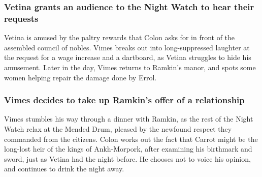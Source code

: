 \subsubsection{\Gls{Vetina} grants an audience to the Night Watch to hear their requests}
\Gls{Vetina} is amused by the paltry rewards that \Gls{Colon} asks for in front of the assembled
council of nobles. \Gls{Vimes} breaks out into long-suppressed laughter at the request for a wage
increase and a dartboard, as \Gls{Vetina} struggles to hide his amusement. Later in the day,
\Gls{Vimes} returns to \Gls{Ramkin}'s manor, and spots some women helping repair the damage done
by \Gls{Errol}.

\subsubsection{\Gls{Vimes} decides to take up \Gls{Ramkin}'s offer of a relationship}
\Gls{Vimes} stumbles his way through a dinner with \Gls{Ramkin}, as the rest of the Night Watch
relax at the Mended Drum, pleased by the newfound respect they commanded from the citizens.
\Gls{Colon} works out the fact that \Gls{Carrot} might be the long-lost heir of the kings of
Ankh-Morpork, after examining his birthmark and sword, just as \Gls{Vetina} had the night before. He
chooses not to voice his opinion, and continues to drink the night away.
